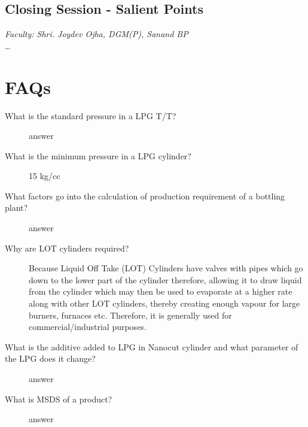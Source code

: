 \documentclass{report}
\begin{document}
	\subsection{Closing Session - Salient Points}
	\textit{Faculty: Shri. Joydev Ojha, DGM(P), Sanand BP}\\
	\ldots
	
	\section{FAQs}
	\begin{description}
		\item[What is the standard pressure in a LPG T/T?] answer
		\item[What is the minimum pressure in a LPG cylinder?] 15 kg/cc
		\item[What factors go into the calculation of production requirement of a bottling plant?] answer
		\item[Why are LOT cylinders required?] Because Liquid Off Take (LOT) Cylinders have valves with pipes which go down to the lower part of the cylinder therefore, allowing it to draw liquid from the cylinder which may then be used to evaporate at a higher rate along with other LOT cylinders, thereby creating enough vapour for large burners, furnaces etc. Therefore, it is generally used for commercial/industrial purposes.
		\item[What is the additive added to LPG in Nanocut cylinder and what parameter of the LPG does it change?] answer
		\item[What is MSDS of a product?]answer
	\end{description}
	\clearpage
	\pagebreak
\end{document}
